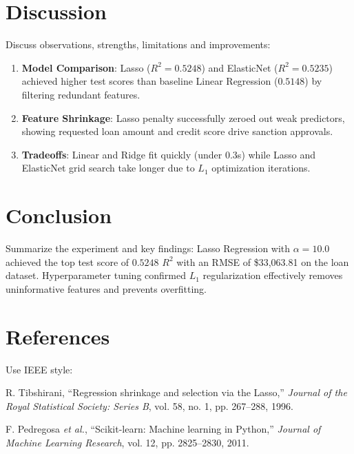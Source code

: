 \documentclass[12pt,a4paper]{article}
\begin{document}
\section{Discussion}
Discuss observations, strengths, limitations and improvements:
\begin{enumerate}
\item \textbf{Model Comparison}: Lasso ($R^2 = 0.5248$) and ElasticNet ($R^2 = 0.5235$) achieved higher test scores than baseline Linear Regression ($0.5148$) by filtering redundant features.
\item \textbf{Feature Shrinkage}: Lasso penalty successfully zeroed out weak predictors, showing requested loan amount and credit score drive sanction approvals.
\item \textbf{Tradeoffs}: Linear and Ridge fit quickly (under 0.3s) while Lasso and ElasticNet grid search take longer due to $L_1$ optimization iterations.
\end{enumerate}

\section{Conclusion}
Summarize the experiment and key findings:
Lasso Regression with $\alpha = 10.0$ achieved the top test score of $0.5248$ $R^2$ with an RMSE of \$33,063.81 on the loan dataset. Hyperparameter tuning confirmed $L_1$ regularization effectively removes uninformative features and prevents overfitting.

\section{References}
Use IEEE style:
\begin{enumerate}[label={[\arabic*]}]
\item R. Tibshirani, ``Regression shrinkage and selection via the Lasso,'' \textit{Journal of the Royal Statistical Society: Series B}, vol. 58, no. 1, pp. 267--288, 1996.
\item F. Pedregosa \textit{et al.}, ``Scikit-learn: Machine learning in Python,'' \textit{Journal of Machine Learning Research}, vol. 12, pp. 2825--2830, 2011.
\end{enumerate}
\end{document}
